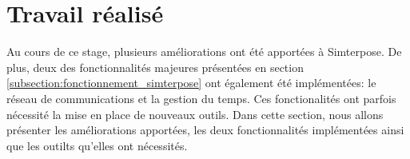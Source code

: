 \section{Travail réalisé}
\label{section:work}
Au cours de ce stage, plusieurs améliorations ont été apportées à Simterpose. De plus, deux des fonctionnalités majeures présentées en section \ref{subsection:fonctionnement_simterpose} ont également été implémentées: le réseau de communications et la gestion du temps. Ces fonctionalités ont parfois nécessité la mise en place de nouveaux outils. Dans cette section, nous allons présenter les améliorations apportées, les deux fonctionnalités implémentées ainsi que les outilts qu'elles ont nécessités.



